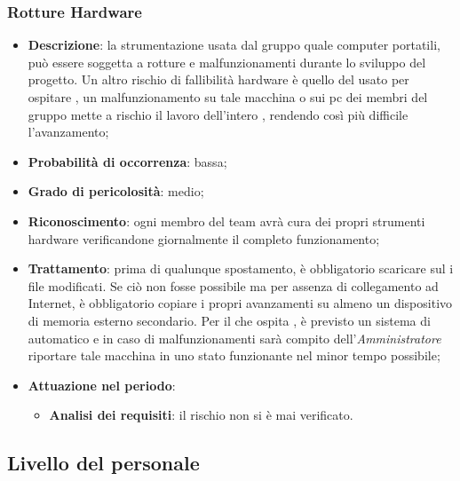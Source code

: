 		\subsubsection{Rotture Hardware}
		\begin{itemize}
			\item \textbf{Descrizione}: la strumentazione usata dal gruppo quale computer portatili, può essere soggetta a rotture e malfunzionamenti durante lo sviluppo del progetto. Un altro rischio di fallibilità hardware è quello del  usato per ospitare 				, un malfunzionamento su tale macchina o sui pc dei membri del gruppo mette a rischio il lavoro dell'intero , rendendo così più difficile l'avanzamento;
			\item \textbf{Probabilità di occorrenza}: bassa;
			\item \textbf{Grado di pericolosità}: medio;
			\item \textbf{Riconoscimento}: ogni membro del team avrà cura dei propri strumenti hardware verificandone giornalmente il completo funzionamento;
			\item \textbf{Trattamento}: prima di qualunque spostamento, è obbligatorio scaricare sul   i file modificati. Se ciò non fosse possibile ma per assenza di collegamento ad Internet, è obbligatorio copiare i propri avanzamenti su almeno un dispositivo di memoria esterno secondario. Per il  che ospita , è previsto un sistema di  automatico e in caso di malfunzionamenti sarà compito dell’\emph{Amministratore} riportare tale macchina in uno stato funzionante nel minor tempo possibile; 
			\item \textbf{Attuazione nel periodo}:
			\begin{itemize}
				\item \textbf{Analisi dei requisiti}: il rischio non si è mai verificato.
			\end{itemize}
		\end{itemize}
	\subsection{Livello del personale}
